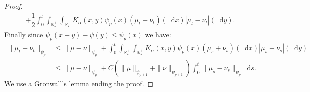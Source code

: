 \documentclass[11pt,a4paper]{article}
\newcommand{\RRP}{\mathbb{R}^+_*}
\newcommand{\MC}{\mathcal{M}}
\newcommand{\SCE}{\emph{SCE}}
\newcommand{\brac}[1]{\left\langle#1\right\rangle}
\newcommand{\dd}{\mathop{}\!\mathrm{d}}
\newtheorem{corollary}[theorem]{Corollary}
\begin{document}
\begin{proof}
\begin{multline*}
        + \dfrac12\int_0^t \int_{\RRP}\int_{\RRP} K_\alpha(x,y)\psi_p(x)\left(\mu_t + \nu_t\right)(\dd x) \left|\mu_t - \nu_t\right|(\dd y).
    \end{multline*}
    Finally since $\psi_p(x+y) - \psi(y) \leq \psi_p(x)$ we have:
    \begin{align*}
        \| \mu_t - \nu_t\|_{\psi_p} &\leq \|\mu- \nu\|_{\psi_p} + \int_0^t \int_{\RRP}\int_{\RRP} K_\alpha(x,y)\psi_p(x)\left(\mu_s + \nu_s\right)(\dd x) \left|\mu_s - \nu_s\right|(\dd y)\\
        &\leq \|\mu- \nu\|_{\psi_p} + C\left(\|\mu\|_{\psi_{p+1}} + \|\nu\|_{\psi_{p+1}}\right) \int_0^t \|\mu_s - \nu_s \|_{\psi_p}\dd s.
    \end{align*}
    We use a Gronwall's lemma ending the proof.
\end{proof}
\end{document}
